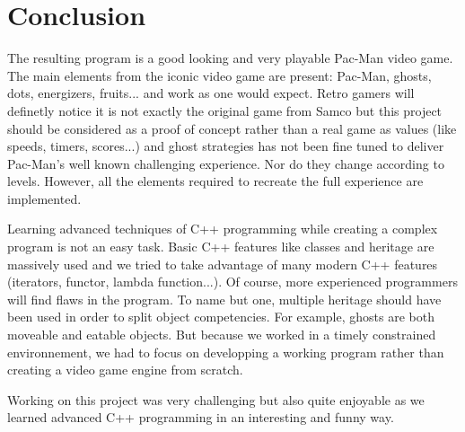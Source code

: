 \section{Conclusion}
The resulting program is a good looking and very playable Pac-Man video game. The main elements from the iconic video game are present: Pac-Man, ghosts, dots, energizers, fruits... and work as one would expect. Retro gamers will definetly notice it is not exactly the original game from Samco but this project should be considered as a proof of concept rather than a real game as values (like speeds, timers, scores...) and ghost strategies has not been fine tuned to deliver Pac-Man's well known challenging experience. Nor do they change according to levels. However, all the elements required to recreate the full experience are implemented.

Learning advanced techniques of C++ programming while creating a complex program is not an easy task. Basic C++ features like classes and heritage are massively used and we tried to take advantage of many modern C++ features (iterators, functor, lambda function...). Of course, more experienced programmers will find flaws in the program. To name but one, multiple heritage should have been used in order to split object competencies. For example, ghosts are both moveable and eatable objects. But because we worked in a timely constrained environnement, we had to focus on developping a working program rather than creating a video game engine from scratch.

Working on this project was very challenging but also quite enjoyable as we learned advanced C++ programming in an interesting and funny way.